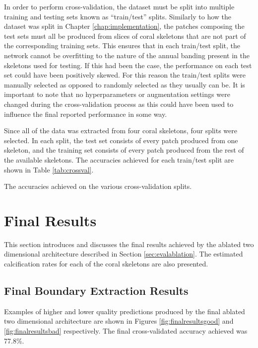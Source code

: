 In order to perform cross-validation, the dataset must be split into multiple training and testing sets known as ``train/test'' splits. Similarly to how the dataset was split in Chapter \ref{chap:implementation}, the patches composing the test sets must all be produced from slices of coral skeletons that are not part of the corresponding training sets. This ensures that in each train/test split, the network cannot be overfitting to the nature of the annual banding present in the skeletons used for testing. If this had been the case, the performance on each test set could have been positively skewed. For this reason the train/test splits were manually selected as opposed to randomly selected as they usually can be. It is important to note that no hyperparameters or augmentation settings were changed during the cross-validation process as this could have been used to influence the final reported performance in some way.

Since all of the data was extracted from four coral skeletons, four splits were selected. In each split, the test set consists of every patch produced from one skeleton, and the training set consists of every patch produced from the rest of the available skeletons. The accuracies achieved for each train/test split are shown in Table \ref{tab:crossval}.

\begin{table}[!t]
    \centering
    \caption{The accuracies achieved on the various cross-validation splits.}
    
    \label{tab:crossval}
\end{table}

\section{Final Results}
\label{sec:finalresults}

This section introduces and discusses the final results achieved by the ablated two dimensional architecture described in Section \ref{sec:evalablation}. The estimated calcification rates for each of the coral skeletons are also presented.

\subsection{Final Boundary Extraction Results}

Examples of higher and lower quality predictions produced by the final ablated two dimensional architecture are shown in Figures \ref{fig:finalresultsgood} and \ref{fig:finalresultsbad} respectively. The final cross-validated accuracy achieved was 77.8\%.

